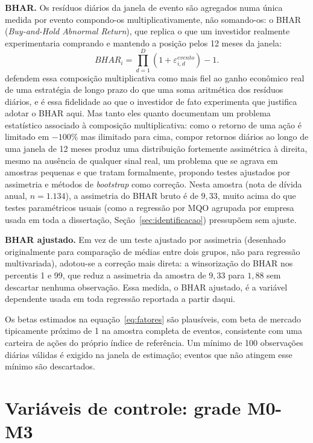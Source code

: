 \documentclass[a4paper,12pt]{report}
\begin{document}
\textbf{BHAR.} Os resíduos diários da janela de evento são agregados numa única medida por evento compondo-os multiplicativamente, não somando-os: o BHAR (\textit{Buy-and-Hold Abnormal Return}), que replica o que um investidor realmente experimentaria comprando e mantendo a posição pelos 12 meses da janela:
\begin{equation}
    \mathit{BHAR}_i = \prod_{d=1}^{D}\left(1 + \varepsilon_{i,d}^{evento}\right) - 1.
    \label{eq:bhar}
\end{equation}
 defendem essa composição multiplicativa como mais fiel ao ganho econômico real de uma estratégia de longo prazo do que uma soma aritmética dos resíduos diários, e é essa fidelidade ao que o investidor de fato experimenta que justifica adotar o BHAR aqui. Mas tanto eles quanto  documentam um problema estatístico associado à composição multiplicativa: como o retorno de uma ação é limitado em $-100\%$ mas ilimitado para cima, compor retornos diários ao longo de uma janela de 12 meses produz uma distribuição fortemente assimétrica à direita, mesmo na ausência de qualquer sinal real, um problema que se agrava em amostras pequenas e que  tratam formalmente, propondo testes ajustados por assimetria e métodos de \textit{bootstrap} como correção. Nesta amostra (nota de dívida anual, $n=1.134$), a assimetria do BHAR bruto é de $9{,}33$, muito acima do que testes paramétricos usuais (como a regressão por MQO agrupada por empresa usada em toda a dissertação, Seção~\ref{sec:identificacao}) pressupõem sem ajuste.

\textbf{BHAR ajustado.} Em vez de um teste ajustado por assimetria (desenhado originalmente para comparação de médias entre dois grupos, não para regressão multivariada), adotou-se a correção mais direta: a winsorização do BHAR nos percentis 1 e 99, que reduz a assimetria da amostra de $9{,}33$ para $1{,}88$ sem descartar nenhuma observação. Essa medida, o BHAR ajustado, é a variável dependente usada em toda regressão reportada a partir daqui.

Os betas estimados na equação~\ref{eq:fatores} são plausíveis, com beta de mercado tipicamente próximo de 1 na amostra completa de eventos, consistente com uma carteira de ações do próprio índice de referência. Um mínimo de 100 observações diárias válidas é exigido na janela de estimação; eventos que não atingem esse mínimo são descartados.

\section{Variáveis de controle: grade M0-M3}
\label{sec:controles}
\end{document}
